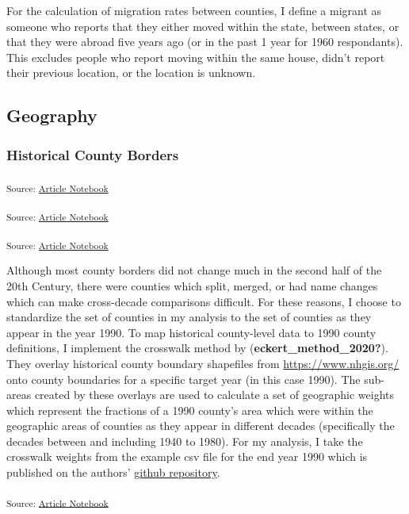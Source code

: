 \documentclass[
]{article}
\begin{document}
For the calculation of migration rates between counties, I define a
migrant as someone who reports that they either moved within the state,
between states, or that they were abroad five years ago (or in the past
1 year for 1960 respondants). This excludes people who report moving
within the same house, didn't report their previous location, or the
location is unknown.

\subsection{Geography}\label{geography}

\subsubsection{Historical County
Borders}\label{historical-county-borders}

\textsubscript{Source:
\href{https://dyasui.github.io/FieldPaper_new/main.qmd.html}{Article
Notebook}}

\textsubscript{Source:
\href{https://dyasui.github.io/FieldPaper_new/main.qmd.html}{Article
Notebook}}

\textsubscript{Source:
\href{https://dyasui.github.io/FieldPaper_new/main.qmd.html}{Article
Notebook}}

Although most county borders did not change much in the second half of
the 20th Century, there were counties which split, merged, or had name
changes which can make cross-decade comparisons difficult. For these
reasons, I choose to standardize the set of counties in my analysis to
the set of counties as they appear in the year 1990. To map historical
county-level data to 1990 county definitions, I implement the crosswalk
method by (\textbf{eckert\_method\_2020?}). They overlay historical
county boundary shapefiles from \href{NHGIS}{https://www.nhgis.org/}
onto county boundaries for a specific target year (in this case 1990).
The sub-areas created by these overlays are used to calculate a set of
geographic weights which represent the fractions of a 1990 county's area
which were within the geographic areas of counties as they appear in
different decades (specifically the decades between and including 1940
to 1980). For my analysis, I take the crosswalk weights from the example
csv file for the end year 1990 which is published on the authors'
\href{https://github.com/liang-jack-a/EGLP_Crosswalk/tree/master}{github
repository}.

\textsubscript{Source:
\href{https://dyasui.github.io/FieldPaper_new/main.qmd.html}{Article
Notebook}}
\end{document}
